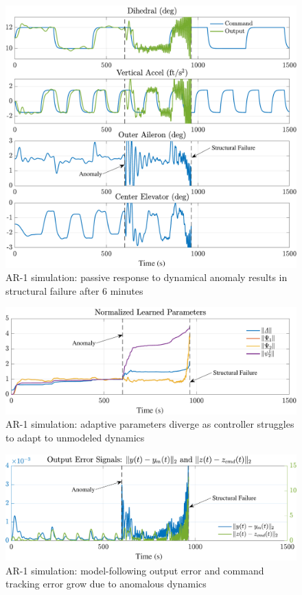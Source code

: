 \documentclass[english]{ifacconf}
\begin{document}
\begin{figure}[htbp]
	\centering
	\includegraphics[width=\columnwidth]{../fig/ar1.pdf}
	\caption{AR-1 simulation: passive response to dynamical anomaly results in structural failure after 6 minutes}
	\label{fig:ar1}
\end{figure}

\begin{figure}[htbp]
	\centering
	\includegraphics[width=\columnwidth]{../fig/ar1-params.pdf}
	\caption{AR-1 simulation: adaptive parameters diverge as controller struggles to adapt to unmodeled dynamics}
	\label{fig:ar1-params}
\end{figure}

\begin{figure}[htbp]
	\centering
	\includegraphics[width=\columnwidth]{../fig/ar1-err.pdf}
	\caption{AR-1 simulation: model-following output error and command tracking error grow due to anomalous dynamics}
	\label{fig:ar1-err}
\end{figure}
\end{document}
